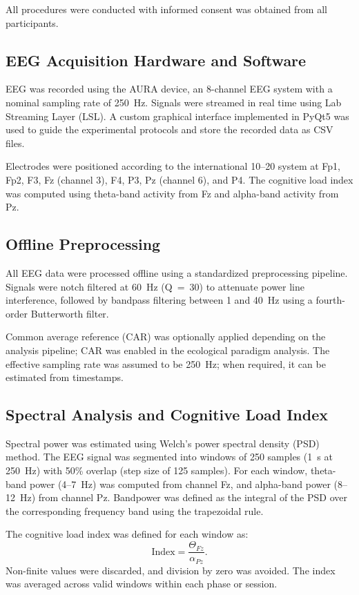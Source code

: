 \documentclass[letterpaper, 10 pt, conference]{ieeeconf}
\begin{document}
All procedures were conducted with informed consent was obtained from all participants.

\subsection{EEG Acquisition Hardware and Software}
EEG was recorded using the AURA device, an 8-channel EEG system with a nominal sampling rate of 250~Hz. Signals were streamed in real time using Lab Streaming Layer (LSL). A custom graphical interface implemented in PyQt5 was used to guide the experimental protocols and store the recorded data as CSV files.

Electrodes were positioned according to the international 10--20 system at Fp1, Fp2, F3, Fz (channel 3), F4, P3, Pz (channel 6), and P4. The cognitive load index was computed using theta-band activity from Fz and alpha-band activity from Pz.

\subsection{Offline Preprocessing}
All EEG data were processed offline using a standardized preprocessing pipeline. Signals were notch filtered at 60~Hz (Q~=~30) to attenuate power line interference, followed by bandpass filtering between 1 and 40~Hz using a fourth-order Butterworth filter. 

Common average reference (CAR) was optionally applied depending on the analysis pipeline; CAR was enabled in the ecological paradigm analysis. The effective sampling rate was assumed to be 250~Hz; when required, it can be estimated from timestamps.

\subsection{Spectral Analysis and Cognitive Load Index}
Spectral power was estimated using Welch’s power spectral density (PSD) method. The EEG signal was segmented into windows of 250 samples (1~s at 250~Hz) with 50\% overlap (step size of 125 samples). For each window, theta-band power (4--7~Hz) was computed from channel Fz, and alpha-band power (8--12~Hz) from channel Pz. Bandpower was defined as the integral of the PSD over the corresponding frequency band using the trapezoidal rule.

The cognitive load index was defined for each window as:
\[
\mathrm{Index} = \frac{\Theta_{Fz}}{\alpha_{Pz}}.
\]
Non-finite values were discarded, and division by zero was avoided. The index was averaged across valid windows within each phase or session.
\end{document}
